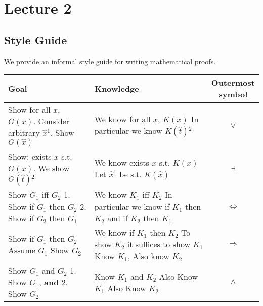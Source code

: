 \section{Lecture 2}

\subsection{Style Guide}
We provide an informal style guide for writing mathematical proofs. 

\begin{center}
    \begin{tabular}{l|l|c}
     Goal & Knowledge & \shortstack[c]{Outermost\\symbol} \\
    \hline 
     \pbox{20cm}{Show for all $x$, $G(x)$. \\ Consider arbitrary $\hat{x}{}^1$.\\ Show $G(\hat{x})$} & \pbox{20cm}{We know for all $x$, $K(x)$ \\ In particular we know $K(\hat{t}){}^2$} & $\forall$ \\
    \hline 
     \pbox{20cm}{Show: exists $x$ s.t. $G(x)$. \\ We show $G(\hat{t}){}^2$} & \pbox{20cm}{We know exists $x$ s.t. $K(x)$ \\ Let $\hat{x}{}^1$ be s.t. $K(\hat{x})$} & $\exists$ \\
     \hline 
     \pbox{20cm}{Show $G_1$ iff $G_2$ \\ 1. Show if $G_1$ then $G_2$\\ 2. Show if $G_2$ then $G_1$} & \pbox{20cm}{We know $K_1$ iff $K_2$\\ In particular we know if $K_1$ then $K_2$\\ and if $K_2$ then $K_1$} & $\iff$ \\ 
     \hline 
     \pbox{20cm}{Show if $G_1$ then $G_2$ \\ Assume $G_1$\\ Show $G_2$} & \pbox{20cm}{We know if $K_1$ then $K_2$\\ To show $K_2$ it suffices to show $K_1$\\ Know $K_1$, Also know $K_2$} & $\Rightarrow$ \\
     \hline 
     \pbox{20cm}{Show $G_1$ and $G_2$\\ 1. Show $G_1$, \textbf{and}\\ 2. Show $G_2$} & \pbox{20cm}{Know $K_1$ and $K_2$\\ Also Know $K_1$ \\ Also Know $K_2$} & $\wedge$ \\

\end{tabular}
\end{center}
